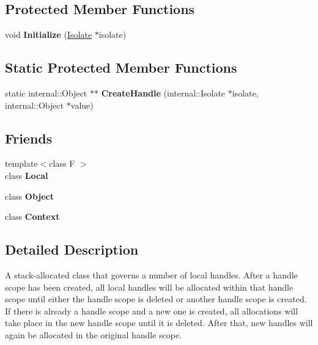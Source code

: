 \subsection*{Protected Member Functions}
\begin{DoxyCompactItemize}
\item 
\mbox{\label{classv8_1_1HandleScope_a7bb8631c1c8756b05e9232b8414dd992}} 
void {\bfseries Initialize} (\mbox{\hyperlink{classv8_1_1Isolate}{Isolate}} $\ast$isolate)
\end{DoxyCompactItemize}
\subsection*{Static Protected Member Functions}
\begin{DoxyCompactItemize}
\item 
\mbox{\label{classv8_1_1HandleScope_a3f63aa8552a0371606305f58187d80e2}} 
static internal\+::\+Object $\ast$$\ast$ {\bfseries Create\+Handle} (internal\+::\+Isolate $\ast$isolate, internal\+::\+Object $\ast$value)
\end{DoxyCompactItemize}
\subsection*{Friends}
\begin{DoxyCompactItemize}
\item 
\mbox{\label{classv8_1_1HandleScope_afb872edb4aac7ba55f0da004113aa2b0}} 
{\footnotesize template$<$class F $>$ }\\class {\bfseries Local}
\item 
\mbox{\label{classv8_1_1HandleScope_a0720b5f434e636e22a3ed34f847eec57}} 
class {\bfseries Object}
\item 
\mbox{\label{classv8_1_1HandleScope_ac26c806e60ca4a0547680edb68f6e39b}} 
class {\bfseries Context}
\end{DoxyCompactItemize}


\subsection{Detailed Description}
A stack-\/allocated class that governs a number of local handles. After a handle scope has been created, all local handles will be allocated within that handle scope until either the handle scope is deleted or another handle scope is created. If there is already a handle scope and a new one is created, all allocations will take place in the new handle scope until it is deleted. After that, new handles will again be allocated in the original handle scope.

